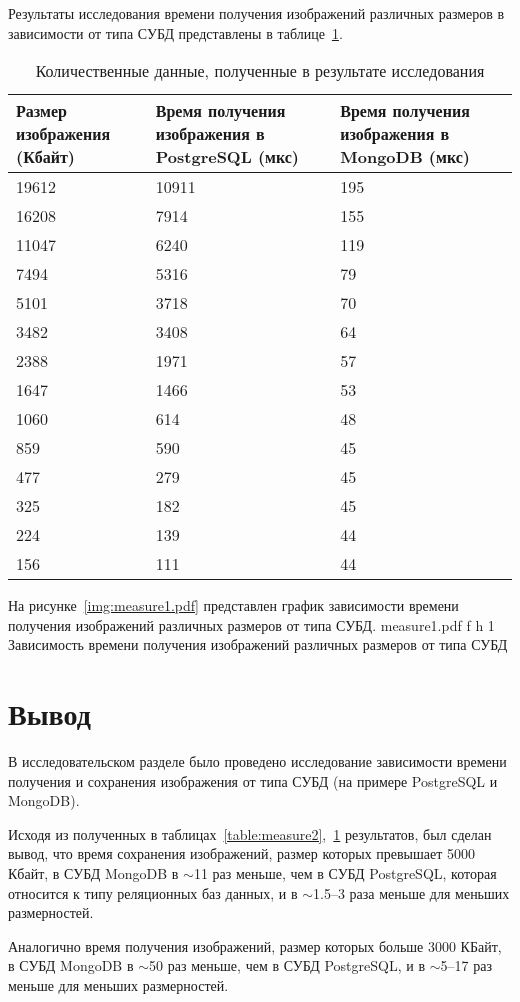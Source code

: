 \clearpage

Результаты исследования времени получения изображений различных размеров в зависимости от типа СУБД представлены в таблице~\ref{table:measure1}.
\begin{table}[!ht]
	\centering
	\caption{\label{table:measure1} Количественные данные, полученные в результате исследования}
	\begin{tabularx}{\textwidth}{|X|X|X|}
		\hline
		Размер изображения (Кбайт) & Время получения изображения в PostgreSQL (мкс) & Время получения изображения в MongoDB (мкс) \\ \hline
      	19612 & 10911 & 195 \\ \hline
		16208 & 7914 & 155 \\ \hline
		11047 & 6240 & 119 \\ \hline
		7494 & 5316 & 79 \\ \hline
		5101 & 3718 & 70 \\ \hline
		3482 & 3408 & 64 \\ \hline
		2388 & 1971 & 57 \\ \hline
		1647 & 1466 & 53 \\ \hline
		1060 & 614 & 48 \\ \hline
		859 & 590 & 45 \\ \hline
		477 & 279 & 45 \\ \hline
		325 & 182 & 45 \\ \hline
		224 & 139 & 44 \\ \hline
		156 & 111 & 44 \\ \hline
	\end{tabularx}
\end{table}

\clearpage

На рисунке~\ref{img:measure1.pdf} представлен график зависимости времени получения изображений различных размеров от типа СУБД.
	{measure1.pdf}
	{f}
	{h}
	{1\textwidth}
	{Зависимость времени получения изображений различных размеров от типа СУБД}

\section*{Вывод}

В исследовательском разделе было проведено исследование зависимости времени получения и сохранения изображения от типа СУБД (на примере PostgreSQL и MongoDB).

Исходя из полученных в таблицах~\ref{table:measure2},~\ref{table:measure1} результатов, был сделан вывод, что время сохранения изображений, размер которых превышает 5000 Кбайт, в СУБД MongoDB в $\sim$11 раз меньше, чем в СУБД PostgreSQL, которая относится к типу реляционных баз данных, и в $\sim$1.5--3 раза меньше для меньших размерностей.

Аналогично время получения изображений, размер которых больше 3000 КБайт, в СУБД MongoDB в $\sim$50 раз меньше, чем в СУБД PostgreSQL, и в $\sim$5--17 раз меньше для меньших размерностей.


